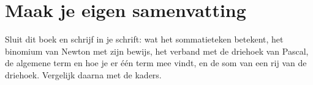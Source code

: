 \begin{oefeningen}






\end{oefeningen}


\ifzelfstudie
\section*{Maak je eigen samenvatting}
Sluit dit boek en schrijf in je schrift: wat het sommatieteken betekent, het binomium van Newton met zijn bewijs, het verband met de driehoek van Pascal, de algemene term en hoe je er één term mee vindt, en de som van een rij van de driehoek. Vergelijk daarna met de kaders.
\fi
